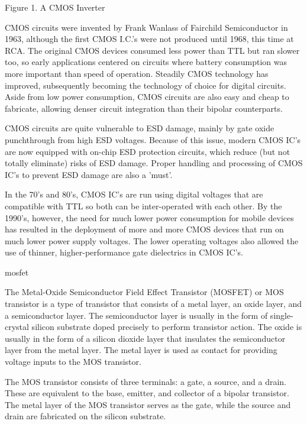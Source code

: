 Figure 1.  A CMOS Inverter





CMOS circuits were invented by Frank Wanlass of Fairchild Semiconductor in 1963, although the first CMOS I.C.'s were not produced until 1968, this time at RCA. The original CMOS devices consumed less power than TTL but ran slower too, so early applications centered on circuits where battery consumption was more important than speed of operation. Steadily CMOS technology has improved, subsequently becoming the technology of choice for digital circuits. Aside from low power consumption, CMOS circuits are also easy and cheap to fabricate, allowing denser circuit integration than their bipolar counterparts.



CMOS circuits are quite vulnerable to ESD damage, mainly by gate oxide punchthrough from high ESD voltages. Because of this issue, modern CMOS IC's are now equipped with on-chip ESD protection circuits, which reduce (but not totally eliminate) risks of ESD damage.  Proper handling and processing of CMOS IC's to prevent ESD damage are also a 'must'.



In the 70's and 80's, CMOS IC's are run using digital voltages that are compatible with TTL so both can be inter-operated with each other.  By the 1990's, however, the need for much lower power consumption for mobile devices has resulted in the deployment of more and more CMOS devices that run on much lower power supply voltages. The lower operating voltages also allowed the use of thinner, higher-performance gate dielectrics in CMOS IC's.






mosfet



The Metal-Oxide Semiconductor Field Effect Transistor (MOSFET) or MOS transistor is a type of transistor that consists of a metal layer, an oxide layer, and a semiconductor layer.  The semiconductor layer is usually in the form of single-crystal silicon substrate doped precisely to perform transistor action.  The oxide is usually in the form of a silicon dioxide layer that insulates the semiconductor layer from the metal layer.  The metal layer is used as contact for providing voltage inputs to the MOS transistor.





The MOS transistor consists of three terminals:  a gate, a source, and a drain.  These are equivalent to the base, emitter, and collector of a bipolar transistor.  The metal layer of the MOS transistor serves as the gate, while the source and drain are fabricated on the silicon substrate.



